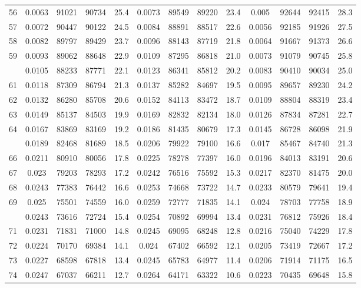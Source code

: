 \documentclass[
  14pt,
]{article}
\begin{document}
\begin{longtable}[t]{lcccccccccccc}
56 & 0.0063 & 91021 & 90734 & 25.4 & 0.0073 & 89549 & 89220 & 23.4 & 0.005 & 92644 & 92415 & 28.3\\
57 & 0.0072 & 90447 & 90122 & 24.5 & 0.0084 & 88891 & 88517 & 22.6 & 0.0056 & 92185 & 91926 & 27.5\\
58 & 0.0082 & 89797 & 89429 & 23.7 & 0.0096 & 88143 & 87719 & 21.8 & 0.0064 & 91667 & 91373 & 26.6\\
59 & 0.0093 & 89062 & 88648 & 22.9 & 0.0109 & 87295 & 86818 & 21.0 & 0.0073 & 91079 & 90745 & 25.8\\
\addlinespace
60 & 0.0105 & 88233 & 87771 & 22.1 & 0.0123 & 86341 & 85812 & 20.2 & 0.0083 & 90410 & 90034 & 25.0\\
61 & 0.0118 & 87309 & 86794 & 21.3 & 0.0137 & 85282 & 84697 & 19.5 & 0.0095 & 89657 & 89230 & 24.2\\
62 & 0.0132 & 86280 & 85708 & 20.6 & 0.0152 & 84113 & 83472 & 18.7 & 0.0109 & 88804 & 88319 & 23.4\\
63 & 0.0149 & 85137 & 84503 & 19.9 & 0.0169 & 82832 & 82134 & 18.0 & 0.0126 & 87834 & 87281 & 22.7\\
64 & 0.0167 & 83869 & 83169 & 19.2 & 0.0186 & 81435 & 80679 & 17.3 & 0.0145 & 86728 & 86098 & 21.9\\
\addlinespace
65 & 0.0189 & 82468 & 81689 & 18.5 & 0.0206 & 79922 & 79100 & 16.6 & 0.017 & 85467 & 84740 & 21.3\\
66 & 0.0211 & 80910 & 80056 & 17.8 & 0.0225 & 78278 & 77397 & 16.0 & 0.0196 & 84013 & 83191 & 20.6\\
67 & 0.023 & 79203 & 78293 & 17.2 & 0.0242 & 76516 & 75592 & 15.3 & 0.0217 & 82370 & 81475 & 20.0\\
68 & 0.0243 & 77383 & 76442 & 16.6 & 0.0253 & 74668 & 73722 & 14.7 & 0.0233 & 80579 & 79641 & 19.4\\
69 & 0.025 & 75501 & 74559 & 16.0 & 0.0259 & 72777 & 71835 & 14.1 & 0.024 & 78703 & 77758 & 18.9\\
\addlinespace
70 & 0.0243 & 73616 & 72724 & 15.4 & 0.0254 & 70892 & 69994 & 13.4 & 0.0231 & 76812 & 75926 & 18.4\\
71 & 0.0231 & 71831 & 71000 & 14.8 & 0.0245 & 69095 & 68248 & 12.8 & 0.0216 & 75040 & 74229 & 17.8\\
72 & 0.0224 & 70170 & 69384 & 14.1 & 0.024 & 67402 & 66592 & 12.1 & 0.0205 & 73419 & 72667 & 17.2\\
73 & 0.0227 & 68598 & 67818 & 13.4 & 0.0245 & 65783 & 64977 & 11.4 & 0.0206 & 71914 & 71175 & 16.5\\
74 & 0.0247 & 67037 & 66211 & 12.7 & 0.0264 & 64171 & 63322 & 10.6 & 0.0223 & 70435 & 69648 & 15.8\\

\end{longtable}
\end{document}
